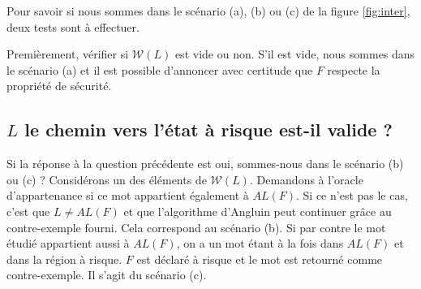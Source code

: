 Pour savoir si nous sommes dans le scénario (a), (b) ou (c) de la figure \ref{fig:inter}, deux tests sont à effectuer.

Premièrement, vérifier si $\mathcal{W}(L)$ est vide ou non. S'il est vide, nous sommes dans le scénario (a) et il est possible d'annoncer avec certitude que $F$ respecte la propriété de sécurité.

\subsection*{$L$ le chemin vers l'état à risque est-il valide ?}

Si la réponse à la question précédente est oui, sommes-nous dans le scénario (b) ou (c) ?
Considérons un des éléments de $\mathcal{W}(L)$. Demandons à l'oracle d'appartenance si ce mot appartient également à $AL(F)$. Si ce n'est pas le cas, c'est que $L\neq AL(F)$ et que l'algorithme d'Angluin peut continuer grâce au contre-exemple fourni. Cela correspond au scénario (b). Si par contre le mot étudié appartient aussi à $AL(F)$, on a un mot étant à la fois dans $AL(F)$ et dans la région à risque. $F$ est déclaré à risque et le mot est retourné comme contre-exemple. Il s'agit du scénario (c).
